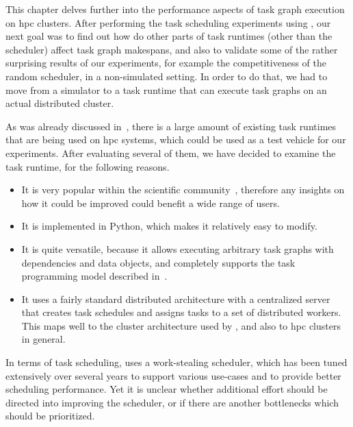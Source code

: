 This chapter delves further into the performance aspects of task graph execution on
\gls{hpc} clusters. After performing the task scheduling experiments using
\estee{}, our next goal was to find out how do other parts of task runtimes
(other than the scheduler) affect task graph makespans, and also to validate some of the rather
surprising results of our experiments, for example the competitiveness of the random scheduler, in
a non-simulated setting. In order to do that, we had to move from a simulator to a task runtime
that can execute task graphs on an actual distributed cluster.

As was already discussed in~, there is a large amount of existing task
runtimes that are being used on \gls{hpc} systems, which could be used as a test
vehicle for our experiments. After evaluating several of them, we have decided to examine the
\dask{}~\cite{dask} task runtime, for the following reasons.
\begin{itemize}
	\setlength\itemsep{0.1em}
	\item It is very popular within the scientific community~\cite{dask-user-survey}, therefore any
	      insights on how it could be improved could benefit a wide range of users.
	\item It is implemented in Python, which makes it relatively easy to modify.
	\item It is quite versatile, because it allows executing arbitrary task graphs with dependencies and data
	      objects, and completely supports the task programming model described in~.
	\item It uses a fairly standard distributed architecture with a centralized server that creates task
	      schedules and assigns tasks to a set of distributed workers. This maps well to the cluster
	      architecture used by \estee{}, and also to \gls{hpc} clusters in
	      general.
\end{itemize}

In terms of task scheduling, \dask{} uses a work-stealing scheduler, which has
been tuned extensively over several years to support various use-cases and to provide better
scheduling performance. Yet it is unclear whether additional effort should be directed into
improving the scheduler, or if there are another bottlenecks which should be prioritized.

